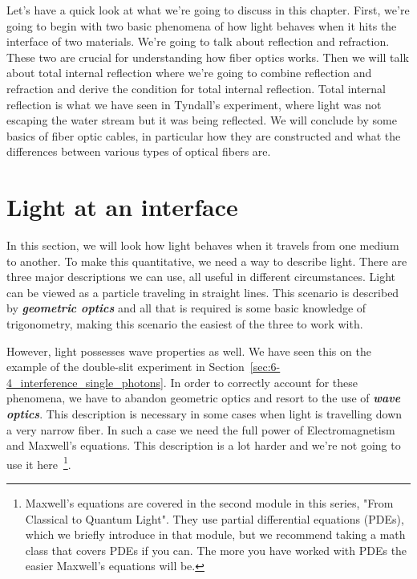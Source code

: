 Let's have a quick look at what we're going to discuss in this chapter.
First, we're going to begin with two basic phenomena of how light behaves when it hits the interface of two materials.
We're going to talk about reflection and refraction.
These two are crucial for understanding how fiber optics works.
Then we will talk about total internal reflection where we're going to combine reflection and refraction and derive the condition for total internal reflection.
Total internal reflection is what we have seen in Tyndall's experiment, where light was not escaping the water stream but it was being reflected.
We will conclude by some basics of fiber optic cables, in particular how they are constructed and what the differences between various types of optical fibers are.


\section{Light at an interface}
\label{sec:7-2_light_at_interface}

In this section, we will look how light behaves when it travels from one medium to another.
To make this quantitative, we need a way to describe light. 
There are three major descriptions we can use, all useful in different circumstances.
Light can be viewed as a particle traveling in straight lines.
This scenario is described by \textit{\textbf{geometric optics}} and all that is required is some basic knowledge of trigonometry, making this scenario the easiest of the three to work with.

However, light possesses wave properties as well.
We have seen this on the example of the double-slit experiment in Section~\ref{sec:6-4_interference_single_photons}. 
In order to correctly account for these phenomena, we have to abandon geometric optics and resort to the use of \textit{\textbf{wave optics}}.
This description is necessary in some cases when light is travelling down a very narrow fiber.
In such a case we need the full power of Electromagnetism and Maxwell's equations.
This description is a lot harder and we're not going to use it here~\footnote{Maxwell's equations are covered in the second module in this series, "From Classical to Quantum Light".  They use partial differential equations (PDEs), which we briefly introduce in that module, but we recommend taking a math class that covers PDEs if you can. The more you have worked with PDEs the easier Maxwell's equations will be.}.

